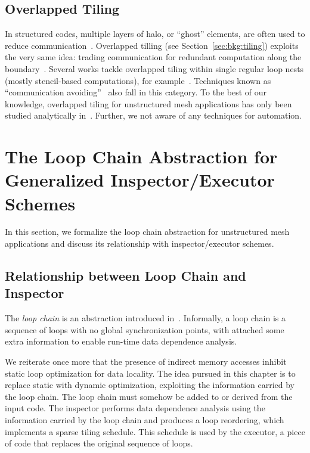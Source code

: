 \subsection*{Overlapped Tiling}
In structured codes, multiple layers of halo, or ``ghost'' elements, are often used to reduce communication~\citep{Bassetti98}. Overlapped tilling (see Section~\ref{sec:bkg:tiling}) exploits the very same idea: trading communication for redundant computation along the boundary~\citep{Zhou12}. Several works tackle overlapped tiling within single regular loop nests (mostly stencil-based computations), for example~\cite{Meng09,Krishnamoorthy07,Chen02}. Techniques known as ``communication avoiding''~\citep{ST-Demmel08,ST-commAvoidingSparse2009} also fall in this category. To the best of our knowledge, overlapped tiling for unstructured mesh applications has only been studied analytically in~\cite{gihan-overlapped}. Further, we not aware of any techniques for automation.



\section{The Loop Chain Abstraction for Generalized Inspector/Executor Schemes}
\label{sec:tiling:lc}
In this section, we formalize the loop chain abstraction for unstructured mesh applications and discuss its relationship with inspector/executor schemes.

\subsection{Relationship between Loop Chain and Inspector}
The \textit{loop chain} is an abstraction introduced in~\cite{ST-KriegerHIPS2013}. Informally, a loop chain is a sequence of loops with no global synchronization points, with attached some extra information to enable run-time data dependence analysis. 

We reiterate once more that the presence of indirect memory accesses inhibit static loop optimization for data locality. The idea pursued in this chapter is to replace static with dynamic optimization, exploiting the information carried by the loop chain. The loop chain must somehow be added to or derived from the input code. The inspector performs data dependence analysis using the information carried by the loop chain and produces a loop reordering, which implements a sparse tiling schedule. This schedule is used by the executor, a piece of code that replaces the original sequence of loops.

